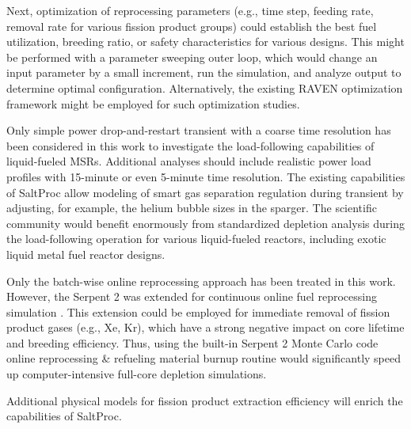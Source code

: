 Next, optimization of reprocessing
parameters (e.g., time step, feeding rate, 
removal
rate for various fission product groups) could establish the best fuel 
utilization, breeding ratio, or
safety characteristics for various designs. 
This might be performed
with a parameter sweeping outer loop, which would 
change an
input parameter by a small increment, run the simulation, and 
analyze output to determine optimal configuration. Alternatively, the
existing 
RAVEN optimization framework \cite{alfonsi_raven_2016}
might be employed for 
such optimization studies.

Only simple power drop-and-restart transient with a coarse time resolution has 
been considered in this work to investigate the load-following capabilities of 
liquid-fueled \glspl{MSR}. Additional analyses should include realistic 
power load profiles with 15-minute or even 5-minute time resolution. The 
existing capabilities of SaltProc allow modeling of smart gas separation 
regulation during transient by adjusting, for example, the helium bubble sizes 
in the sparger. The scientific community would benefit enormously from 
standardized depletion analysis during the load-following operation for 
various liquid-fueled reactors, including exotic liquid metal fuel reactor 
designs.

Only the batch-wise online reprocessing approach has been treated in this 
work. However, the Serpent 2 was extended for continuous online fuel 
reprocessing simulation \cite{aufiero_extended_2013}. This extension could be 
employed for immediate removal of fission product gases (e.g., Xe, Kr), which 
have a strong negative impact on core lifetime and breeding efficiency. 
Thus, using the built-in Serpent 2 Monte Carlo code online reprocessing \& 
refueling material burnup routine would significantly speed up 
computer-intensive full-core depletion simulations.


Additional physical models for fission product extraction efficiency will 
enrich the capabilities of SaltProc.


